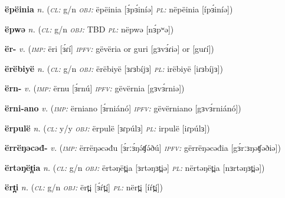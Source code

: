 \newentry
\headword\textbf{ëpëinia}  
\ipa{[ɜ́pɜ́iníə]}
\synpos\textit{n.} 
\class(\textit{\textsc{cl:}} {g/n}
\object\textit{\textsc{obj:}} ëpëinia [ɜ́pɜ́iníə]
\plural\textit{\textsc{pl:}} nëpëinia [ípɜ́iníə])

\newentry
\headword\textbf{ëpwə}  
\ipa{[ɜ́pʷə]}
\synpos\textit{n.} 
\class(\textit{\textsc{cl:}} {g/n}
\object\textit{\textsc{obj:}} TBD
\plural\textit{\textsc{pl:}} nëpwə [nɜ́pʷə])

\newentry
\headword\textbf{ër-}  
\ipa{[ɜɾ-]}
\synpos\textit{v.} 
\imperative(\textit {\textsc{imp:}} ëri [ɜ́ɾí] 
\imperfective\textit{\textsc{ipfv:}} gëvëria or guri [gɜvɜ́ɾiə] or [guɾí]) %

\newentry
\headword\textbf{ërëbiyë}  
\ipa{[ɜɾɜbíjɜ]}
\synpos\textit{n.} 
\class(\textit{\textsc{cl:}} {g/n}
\object\textit{\textsc{obj:}} ërëbiyë [ɜɾɜbíjɜ]
\plural\textit{\textsc{pl:}} irëbiyë [iɾɜbíjɜ])

\newentry
\headword\textbf{ërn-}  
\ipa{[ɜ́rn-]}
\synpos\textit{v.} 
\imperative(\textit {\textsc{imp:}} ërnu [ɜ́rnú] 
\imperfective\textit{\textsc{ipfv:}} gëvërnia [gɜvɜ́rniə])

\newentry
\headword\textbf{ërni-ano}  
\ipa{[ɜ́rni-ánó]}
\synpos\textit{v.} 
\imperative(\textit {\textsc{imp:}} ërniano [ɜ́rniánó] 
\imperfective\textit{\textsc{ipfv:}} gëvërniano [gɜvɜ́rniánó])

\newentry
\headword\textbf{ërpulë}  
\ipa{[ɜɾpúlɜ]}
\synpos\textit{n.} 
\class(\textit{\textsc{cl:}} {y/y}
\object\textit{\textsc{obj:}} ërpulë [ɜɾpúlɜ]
\plural\textit{\textsc{pl:}} irpulë [iɾpúlɜ])

\newentry
\headword\textbf{ërrëŋəcəđ-}  
\ipa{[ɜ́rːɜŋəʧəð-]}
\synpos\textit{v.} 
\imperative(\textit {\textsc{imp:}} ërrëŋəcəđu [ɜ́rːɜ́ŋə́ʧə́ðú] 
\imperfective\textit{\textsc{ipfv:}} gërrëŋəcəđia [gɜ́rːɜŋəʧəðiə])

\newentry
\headword\textbf{ërtəŋët̪ia}  
\ipa{[ɜrtəŋɜt̪iə]}
\synpos\textit{n.} 
\class(\textit{\textsc{cl:}} {g/n}
\object\textit{\textsc{obj:}} ërtəŋët̪ia [ɜrtəŋɜt̪iə]
\plural\textit{\textsc{pl:}} nërtəŋët̪ia [nɜrtəŋɜt̪iə])

\newentry
\headword\textbf{ërt̪i}  
\ipa{[ɜ́ŕt̪í]}
\synpos\textit{n.} 
\class(\textit{\textsc{cl:}} {g/n}
\object\textit{\textsc{obj:}} ërt̪i [ɜ́ŕt̪í]
\plural\textit{\textsc{pl:}} nërt̪i [íŕt̪í])



